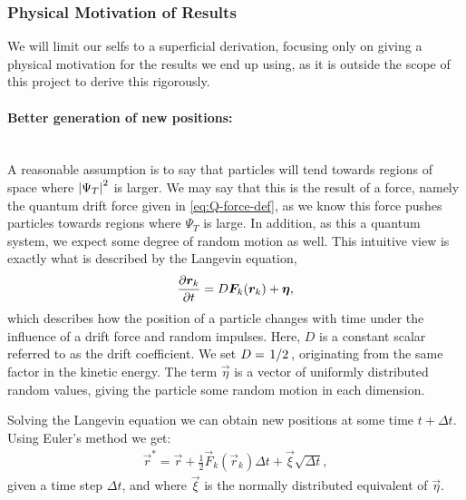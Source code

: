 \documentclass[a4paper, 11pt]{article}
\begin{document}
\begin{multicols}{2}
\subsubsection{Physical Motivation of Results}
We will limit our selfs to a superficial derivation, focusing only on giving a
physical motivation for the results we end up using, as it is outside the scope
of this project to derive this rigorously.

\paragraph{Better generation of new positions:}$\,$\\
A reasonable assumption is to say that particles will tend towards regions of
space where $\abs{\Psi_T}^2$ is larger. We may say that this is the result of a
force, namely the quantum drift force given in \eqref{eq:Q-force-def}, as we
know this force pushes particles towards regions where $\Psi_T$ is large. In
addition, as this a quantum system, we expect some degree of random motion as
well. This intuitive view is exactly what is described by
the Langevin equation,
\begin{align}
    \pdv{\bm r_k}{t} = D\bm F_k(\bm r_k) + \bm\eta,\label{eq:Langevin}
\end{align}
which describes how the position of a particle changes with time under the
influence of a drift force and random impulses. Here, $D$ is
a constant scalar referred to as the drift coefficient. We set
$D=\flatfrac{1}{2}$, originating from the same factor in the kinetic energy. The
term $\vec\eta$ is a vector of
uniformly distributed random values, giving the particle some random motion in each
dimension.

Solving the Langevin equation we can obtain new positions at some time
$t+\Delta t$. Using Euler's method we get:
\begin{align}
    \vec r^* = \vec r + \frac{1}{2}\vec F_k(\vec r_k)\Delta t + \vec \xi\sqrt{\Delta
    t}\label{eq:Langevin-solution},
\end{align}
given a time step $\Delta t$, and where $\vec \xi$ is the normally distributed
equivalent of $\vec \eta$. 


\end{multicols}
\end{document}
